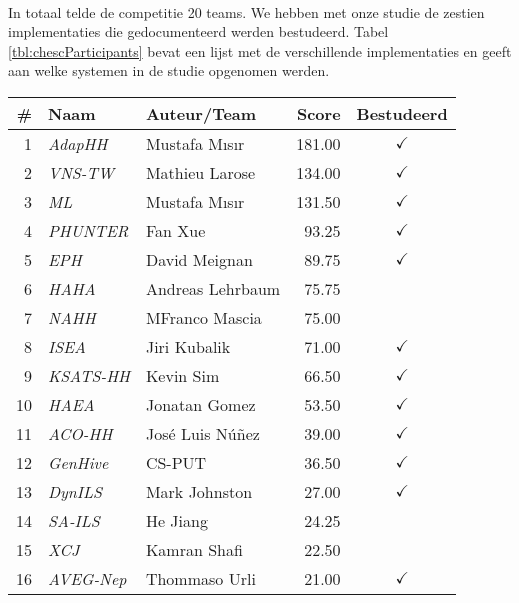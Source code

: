 \paragraph{}
In totaal telde de competitie 20 teams. We hebben met onze studie de zestien implementaties die gedocumenteerd werden bestudeerd. Tabel \ref{tbl:chescParticipants} bevat een lijst met de verschillende implementaties en geeft aan welke systemen in de studie opgenomen werden.

\begin{table}[hbt]
  \centering
  \begin{tabular}{rllrc} \toprule
    \#&Naam&Auteur/Team&Score&Bestudeerd\\\midrule
    1&	\emph{AdapHH}\cite{chesc-adaphh,chesc-adaphh2,348072}	&	Mustafa M\i{}s\i{}r&	181.00&	$\checkmark$\\
    2&	\emph{VNS-TW}\cite{chesc-vns-tw}&				Mathieu Larose&		134.00&	$\checkmark$\\
    3&	\emph{ML}\cite{chesc-ml,chesc-ml2}&				Mustafa M\i{}s\i{}r&	131.50&	$\checkmark$\\
    4&	\emph{PHUNTER}\cite{chesc-phunter}&				Fan Xue&		93.25&	$\checkmark$\\
    5&	\emph{EPH}\cite{chesc-eph}&					David Meignan&		89.75&	$\checkmark$\\
    6&	\emph{HAHA}&							Andreas Lehrbaum&	75.75&	\\
    7&	\emph{NAHH}&							MFranco Mascia&		75.00&	\\
    8&	\emph{ISEA}\cite{chesc-isea}&					Jiri Kubalik&		71.00&	$\checkmark$\\
    9&	\emph{KSATS-HH}\cite{chesc-ksats-hh}&				Kevin Sim&		66.50&	$\checkmark$\\
    10&	\emph{HAEA}\cite{chesc-haea,Gomez04selfadaptation}&		Jonatan Gomez&		53.50&	$\checkmark$\\
    11&	\emph{ACO-HH}\cite{chesc-aco-hh}&				Jos\'e Luis N\'u\~nez&	39.00&	$\checkmark$\\
    12&	\emph{GenHive}\cite{chesc-genhive}&				CS-PUT&			36.50&	$\checkmark$\\
    13&	\emph{DynILS}\cite{chesc-dynils,journals/orsnz/ksosils}&	Mark Johnston&		27.00&	$\checkmark$\\
    14&	\emph{SA-ILS}&							He Jiang&		24.25&	\\
    15&	\emph{XCJ}&							Kamran Shafi&		22.50&	\\
    16&	\emph{AVEG-Nep}\cite{chesc-aveg-nep}&				Thommaso Urli&		21.00&	$\checkmark$\\

\end{tabular}
\end{table}
